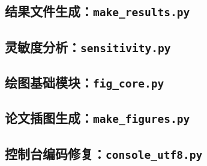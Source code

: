 \documentclass[withoutpreface,bwprint]{cumcmthesis}
\begin{document}
\subsection{结果文件生成：\texttt{make\_results.py}}


\subsection{灵敏度分析：\texttt{sensitivity.py}}


\subsection{绘图基础模块：\texttt{fig\_core.py}}


\subsection{论文插图生成：\texttt{make\_figures.py}}


\subsection{控制台编码修复：\texttt{console\_utf8.py}}

\end{document}
